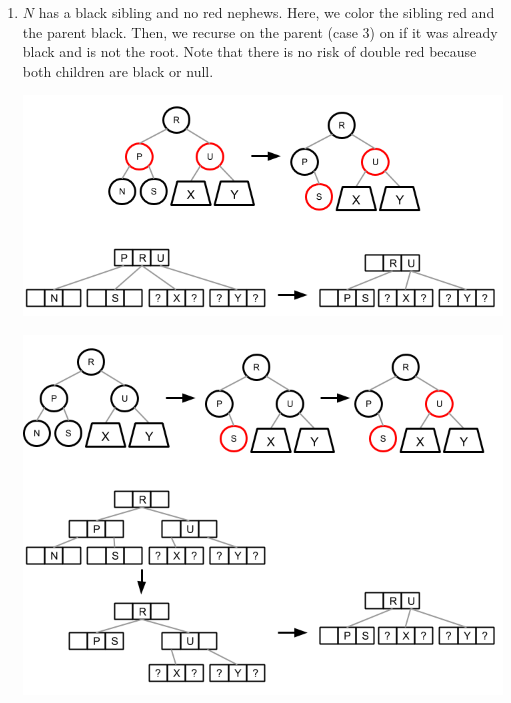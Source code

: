\documentclass[12pt]{article}
\begin{document}
\begin{enumerate}
\begin{enumerate}
    \item \label{bleaf_bsib2} $N$ has a black sibling and no red nephews. Here, we color the sibling red and the parent black. Then, we recurse on the parent (case 3) on if it was already black and is not the root. Note that there is no risk of double red because both children are black or null.
    \begin{center}
      \includegraphics[scale=0.5]{pics/red_black_tree/del_bleaf_bsib_bnephs_rpar}
    \end{center}
    \begin{center}
      \includegraphics[scale=0.5]{pics/red_black_tree/del_bleaf_bsib_bnephs_bpar}
    \end{center}


\end{enumerate}
\end{enumerate}
\end{document}
